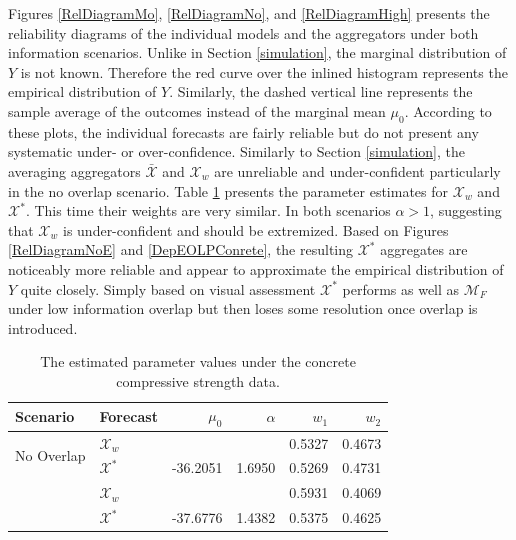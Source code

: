 \documentclass[11pt]{article}
\theoremstyle{definition}
\theoremstyle{definition}
\begin{document}
Figures \ref{RelDiagramMo}, \ref{RelDiagramNo}, and \ref{RelDiagramHigh} presents the reliability diagrams of the individual models and the aggregators under both information scenarios. Unlike in Section \ref{simulation}, the marginal distribution of $Y$ is not known. Therefore the red curve over the inlined histogram represents the empirical distribution of $Y$. Similarly, the dashed vertical line represents the sample average of the outcomes instead of the marginal mean $\mu_0$. According to these plots, the individual forecasts are fairly reliable but do not present any systematic under- or over-confidence. Similarly to Section \ref{simulation}, the averaging aggregators $\bar{\mathcal{X}}$ and $\mathcal{X}_w$ are  unreliable and under-confident particularly in the no overlap scenario. Table \ref{NoParamsReal} presents the parameter estimates for $\mathcal{X}_w$ and $\mathcal{X}^*$.  This time their weights are very similar. 
In both scenarios $\alpha > 1$, suggesting that $\mathcal{X}_w$ is under-confident and should be extremized. Based on Figures \ref{RelDiagramNoE} and  \ref{DepEOLPConrete}, the resulting $\mathcal{X}^*$ aggregates are noticeably more reliable and appear to approximate the empirical distribution of $Y$ quite closely. Simply based on visual assessment $\mathcal{X}^*$ performs as well as $\mathcal{M}_F$ under low information overlap but then loses some resolution once  overlap is introduced. 

\begin{table}[ht]
\centering
\caption{The estimated parameter values 
under the concrete compressive strength data. }
\begin{tabular}{llrrrr}
   \hline \hline
Scenario & Forecast & $\mu_0$ & $\alpha$ & $w_1$ & $w_2$\\
  \hline
\multirow{2}{*}{No Overlap} & $\mathcal{X}_w$ &  &  & 0.5327 & 0.4673 \\ 
&  $\mathcal{X}^*$ & -36.2051 & 1.6950 & 0.5269 & 0.4731 \\  \rule{0pt}{2.9ex} 
\multirow{2}{*}{High Overlap}  & $\mathcal{X}_w$ &  &  & 0.5931 & 0.4069 \\ 
 & $\mathcal{X}^*$ & -37.6776 & 1.4382 & 0.5375 & 0.4625 \\ 
   \hline
\end{tabular}
\label{NoParamsReal}
\end{table}
\end{document}
